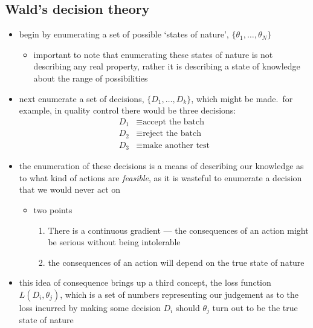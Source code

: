 \documentclass[../jaynes_prob_theory_notes.tex]{subfiles}
\begin{document}
        \subsection{Wald's decision theory}
            \begin{itemize} 
                \item begin by enumerating a set of possible `states of nature',  \(\{\theta_1, \ldots, \theta_N\}\)
                    \begin{itemize} 
                        \item important to note that enumerating these states of nature is not describing any real property, rather it is describing a state of knowledge about the range of possibilities
                    \end{itemize}
                \item next enumerate a set of decisions, \(\{D_1, \ldots, D_k\}\), which might be made.\ for example, in quality control there would be three decisions:
                    \begin{align*}
                        D_1 &\equiv \text{accept the batch} \\
                        D_2 &\equiv \text{reject the batch} \\
                        D_3 &\equiv \text{make another test}
                    \end{align*}
                \item the enumeration of these decisions is a means of describing our knowledge as to what kind of actions are \textit{feasible}, as it is wasteful to enumerate a decision that we would never act on
                    \begin{itemize} 
                        \item two points
                            \begin{enumerate}
                                \item There is a continuous gradient --- the consequences of an action might be serious without being intolerable
                                \item the consequences of an action will depend on the true state of nature
                            \end{enumerate}
                    \end{itemize}
                \item this idea of consequence brings up a third concept, the loss function \(L(D_i, \theta_j)\), which is a set of numbers representing our judgement as to the loss incurred by making some decision \(D_i\) should \(\theta_j\) turn out to be the true state of nature

\end{itemize}
\end{document}
